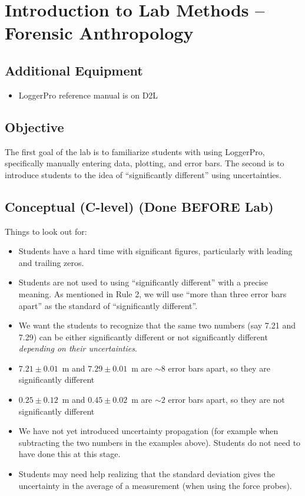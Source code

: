 \documentclass[fleqn,letterpaper]{article}
\begin{document}
\cfoot{}
\headsep=25pt

\section*{Introduction to Lab Methods -- Forensic Anthropology}

\subsection*{Additional Equipment}

\begin{itemize}
  \item{LoggerPro reference manual is on D2L}
\end{itemize}

\subsection*{Objective}

The first goal of the lab is to familiarize students with using LoggerPro, specifically manually entering data, plotting, and error bars.  The second is to introduce students to the idea of ``significantly different'' using uncertainties.

\subsection*{Conceptual (C-level) (Done BEFORE Lab)}

Things to look out for:

\begin{itemize}
 \item{Students have a hard time with significant figures, particularly with leading and trailing zeros.}
 \item{Students are not used to using ``significantly different'' with a precise meaning.  As mentioned in Rule 2, we will use ``more than three error bars apart'' as the standard of ``significantly different''.}
 \item{We want the students to recognize that the same two numbers (say 7.21 and 7.29) can be either significantly different or not significantly different \textit{depending on their uncertainties}.}
 \item{$7.21 \pm 0.01$~m and $7.29 \pm 0.01$~m are $\sim8$ error bars apart, so they are significantly different}
 \item{$0.25 \pm 0.12$~m and $0.45 \pm 0.02$~m are $\sim 2$ error bars apart, so they are not significantly different}
 \item{We have not yet introduced uncertainty propagation (for example when subtracting the two numbers in the examples above).  Students do not need to have done this at this stage.}
 \item{Students may need help realizing that the standard deviation gives the uncertainty in the average of a measurement (when using the force probes).}
\end{itemize}
\end{document}
